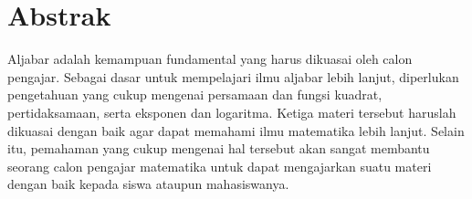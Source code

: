 \chapter{Abstrak}

Aljabar adalah kemampuan fundamental yang harus dikuasai oleh calon pengajar. Sebagai dasar untuk mempelajari ilmu aljabar lebih lanjut, diperlukan pengetahuan yang cukup mengenai persamaan dan fungsi kuadrat, pertidaksamaan, serta eksponen dan logaritma. Ketiga materi tersebut haruslah dikuasai dengan baik agar dapat memahami ilmu matematika lebih lanjut. Selain itu, pemahaman yang cukup mengenai hal tersebut akan sangat membantu seorang calon pengajar matematika untuk dapat mengajarkan suatu materi dengan baik kepada siswa ataupun mahasiswanya.